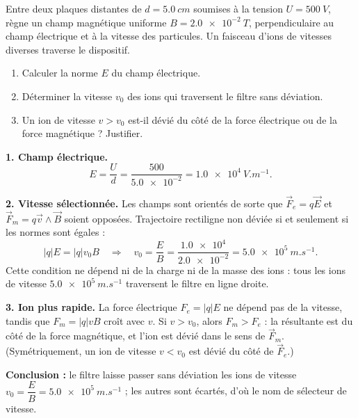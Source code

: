 \documentclass[11pt]{article}
\newcommand{\cle}[1]{{\popxbold\color{popdark}#1}}
\begin{document}
\begin{exoresolu}
Entre deux plaques distantes de $d=\SI{5,0}{cm}$ soumises à la tension $U=\SI{500}{V}$, règne un champ magnétique uniforme $B=\SI{2,0e-2}{T}$, perpendiculaire au champ électrique et à la vitesse des particules. Un faisceau d'ions de vitesses diverses traverse le dispositif.
\begin{enumerate}
\item Calculer la norme $E$ du champ électrique.
\item Déterminer la vitesse $v_0$ des ions qui traversent le filtre sans déviation.
\item Un ion de vitesse $v>v_0$ est-il dévié du côté de la force électrique ou de la force magnétique ? Justifier.
\end{enumerate}
\tcblower
\textbf{1. Champ électrique.}
\[ E=\dfrac{U}{d}=\dfrac{500}{\num{5,0e-2}}=\SI{1,0e4}{V.m^{-1}}. \]

\textbf{2. Vitesse sélectionnée.} Les champs sont orientés de sorte que $\vec{F}_e=q\vec{E}$ et $\vec{F}_m=q\vec{v}\wedge\vec{B}$ soient opposées. Trajectoire rectiligne non déviée si et seulement si les normes sont égales :
\[ |q|E=|q|v_0B \quad\Longrightarrow\quad v_0=\dfrac{E}{B}=\dfrac{\num{1,0e4}}{\num{2,0e-2}}=\SI{5,0e5}{m.s^{-1}}. \]
Cette condition ne dépend ni de la charge ni de la masse des ions : tous les ions de vitesse $\SI{5,0e5}{m.s^{-1}}$ traversent le filtre en ligne droite.

\textbf{3. Ion plus rapide.} La force électrique $F_e=|q|E$ ne dépend pas de la vitesse, tandis que $F_m=|q|vB$ croît avec $v$. Si $v>v_0$, alors $F_m>F_e$ : la résultante est du côté de la force magnétique, et l'ion est dévié dans le sens de $\vec{F}_m$. (Symétriquement, un ion de vitesse $v<v_0$ est dévié du côté de $\vec{F}_e$.)

\textbf{Conclusion :} le filtre laisse passer sans déviation les ions de vitesse $v_0=\dfrac{E}{B}=\SI{5,0e5}{m.s^{-1}}$ ; les autres sont écartés, d'où le nom de \cle{sélecteur de vitesse}.
\end{exoresolu}
\end{document}
